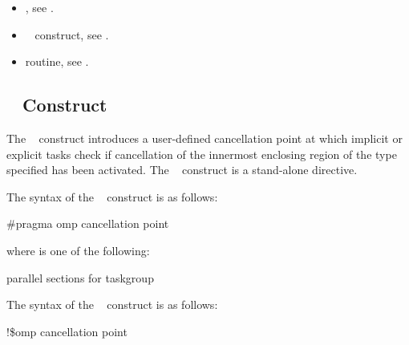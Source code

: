 \crossreferences
\begin{itemize}
\item {}, see 
.

\item {}~ construct, see 
.

\item {} routine, see 
.
\end{itemize}









\subsection{~ Construct}
\label{subsec:cancellation point Construct}
\summary
The ~ construct introduces a user-defined cancellation point at 
which implicit or explicit tasks check if cancellation of the innermost enclosing region 
of the type specified has been activated. The ~ construct is a 
stand-alone directive.

\syntax
\ccppspecificstart
The syntax of the ~ construct is as follows:

\begin{boxedcode}
\#pragma omp cancellation point 
\end{boxedcode}

where  is one of the following:

\begin{indentedcodelist}
parallel
sections
for
taskgroup
\end{indentedcodelist}
\ccppspecificend

\fortranspecificstart
The syntax of the ~ construct is as follows:

\begin{boxedcode}
!\$omp cancellation point 
\end{boxedcode}

